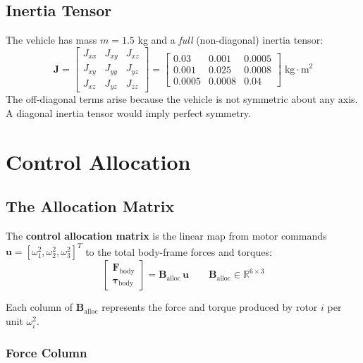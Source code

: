 \documentclass[12pt, a4paper]{article}
\newcommand{\R}{\mathbb{R}}
\newcommand{\bu}{\bm{u}}
\newcommand{\btau}{\bm{\tau}}
\newcommand{\bF}{\bm{F}}
\newcommand{\bJ}{\bm{J}}
\newcommand{\bB}{\bm{B}}
\begin{document}
\subsection{Inertia Tensor}

The vehicle has mass $m = 1.5$ kg and a \emph{full} (non-diagonal) inertia tensor:
\begin{equation}
    \bJ = \begin{bmatrix} J_{xx} & J_{xy} & J_{xz} \\ J_{xy} & J_{yy} & J_{yz} \\ J_{xz} & J_{yz} & J_{zz} \end{bmatrix}
    = \begin{bmatrix} 0.03 & 0.001 & 0.0005 \\ 0.001 & 0.025 & 0.0008 \\ 0.0005 & 0.0008 & 0.04 \end{bmatrix}
    \; \text{kg}\cdot\text{m}^2
\end{equation}
The off-diagonal terms arise because the vehicle is not symmetric about any axis.  A diagonal inertia tensor would imply perfect symmetry.

\section{Control Allocation}
\label{sec:control_alloc}

\subsection{The Allocation Matrix}

The \textbf{control allocation matrix} is the linear map from motor commands $\bu = [\omega_1^2, \omega_2^2, \omega_3^2]^T$ to the total body-frame forces and torques:
\begin{equation}
    \begin{bmatrix} \bF_{\text{body}} \\ \btau_{\text{body}} \end{bmatrix}
    = \bB_{\text{alloc}} \, \bu
    \qquad
    \bB_{\text{alloc}} \in \R^{6 \times 3}
\end{equation}

Each column of $\bB_{\text{alloc}}$ represents the force and torque produced by rotor $i$ per unit $\omega_i^2$.

\subsubsection{Force Column}
\end{document}
